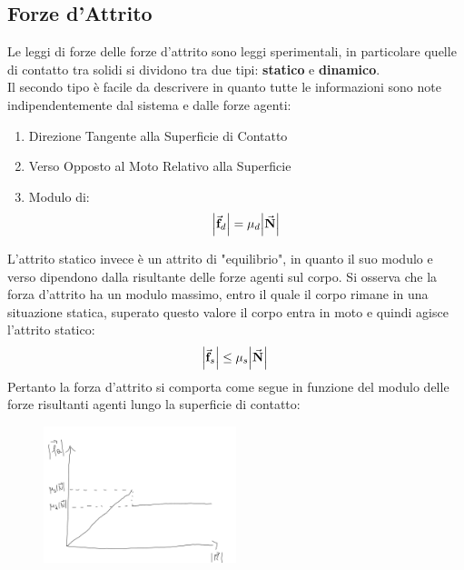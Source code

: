 \documentclass{report}
\newcommand{\N}{\va{N}}
\newcommand{\f}{\va{f}}
\begin{document}
\subsection{Forze d'Attrito}
Le leggi di forze delle forze d'attrito sono leggi sperimentali, in particolare quelle di contatto tra solidi si dividono tra due tipi: \textbf{statico} e \textbf{dinamico}. \\
Il secondo tipo è facile da descrivere in quanto tutte le informazioni sono note indipendentemente dal sistema e dalle forze agenti:
\begin{enumerate}
    \item Direzione Tangente alla Superficie di Contatto
    \item Verso Opposto al Moto Relativo alla Superficie
    \item Modulo di:
    \[\abs{\f_d}=\mu_d\abs{\N}\]
\end{enumerate}
L'attrito statico invece è un attrito di "equilibrio", in quanto il suo modulo e verso dipendono dalla risultante delle forze agenti sul corpo. Si osserva che la forza d'attrito ha un modulo massimo, entro il quale il corpo rimane in una situazione statica, superato questo valore il corpo entra in moto e quindi agisce l'attrito statico:
\[\abs{\f_s}\leq\mu_s\abs{\N}\]
Pertanto la forza d'attrito si comporta come segue in funzione del modulo delle forze risultanti agenti lungo la superficie di contatto:
\begin{figure}[H]
    \centering
    \includegraphics[width=0.5\textwidth]{Attrito.png}
\end{figure}
\end{document}
